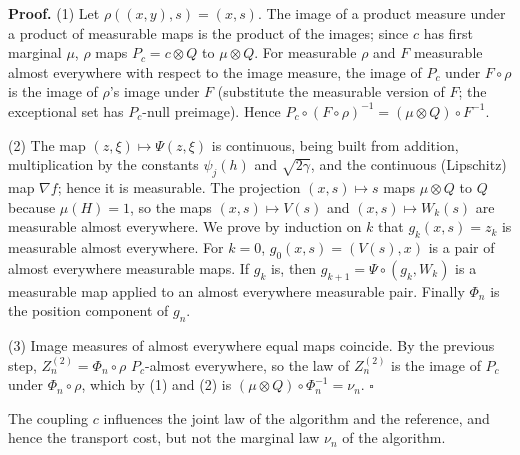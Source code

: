 \documentclass[11pt,a4paper]{article}
\begin{document}
\textbf{Proof.} (1) Let \(\rho((x,y),s)=(x,s)\). The image of a product measure under a product of measurable maps is the product of the images; since \(c\) has first marginal \(\mu\), \(\rho\) maps \(P_c=c\otimes Q\) to \(\mu\otimes Q\). For measurable \(\rho\) and \(F\) measurable almost everywhere with respect to the image measure, the image of \(P_c\) under \(F\circ\rho\) is the image of \(\rho\)'s image under \(F\) (substitute the measurable version of \(F\); the exceptional set has \(P_c\)-null preimage). Hence \(P_c\circ(F\circ\rho)^{-1}=(\mu\otimes Q)\circ F^{-1}\).




(2) The map \((z,\xi)\mapsto\Psi(z,\xi)\) is continuous, being built from addition, multiplication by the constants \(\psi_j(h)\) and \(\sqrt{2\gamma}\), and the continuous (Lipschitz) map \(\nabla f\); hence it is measurable. The projection \((x,s)\mapsto s\) maps \(\mu\otimes Q\) to \(Q\) because \(\mu(H)=1\), so the maps \((x,s)\mapsto V(s)\) and \((x,s)\mapsto W_k(s)\) are measurable almost everywhere. We prove by induction on \(k\) that \(g_k(x,s)=z_k\) is measurable almost everywhere. For \(k=0\), \(g_0(x,s)=(V(s),x)\) is a pair of almost everywhere measurable maps. If \(g_k\) is, then \(g_{k+1}=\Psi\circ(g_k,W_k)\) is a measurable map applied to an almost everywhere measurable pair. Finally \(\Phi_n\) is the position component of \(g_n\).




(3) Image measures of almost everywhere equal maps coincide. By the previous step, \(Z_n^{(2)}=\Phi_n\circ\rho\) \(P_c\)-almost everywhere, so the law of \(Z_n^{(2)}\) is the image of \(P_c\) under \(\Phi_n\circ\rho\), which by (1) and (2) is \((\mu\otimes Q)\circ\Phi_n^{-1}=\nu_n\). \(\square\)




The coupling \(c\) influences the joint law of the algorithm and the reference, and hence the transport cost, but not the marginal law \(\nu_n\) of the algorithm.
\end{document}
